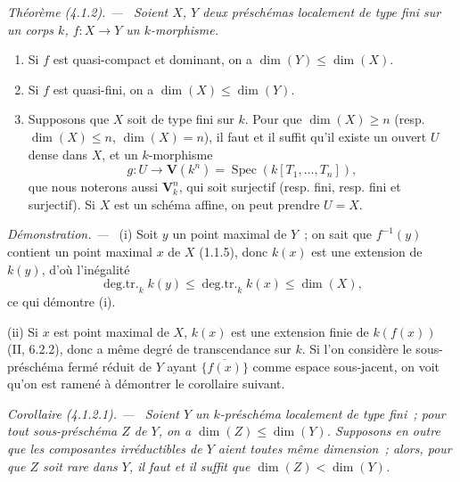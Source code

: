 \documentclass[10pt,oneside]{book}
\newcommand{\oldpage}[2][]{%
  \setcounter{footnote}{0}%
  \marginpar{\scriptsize\textbf{#1}~|~#2}\ignorespaces}
\newenvironment{theorem}[1][]{%
  \par\medskip\noindent\itshape Théorème (#1). ---\ }{\par}
\newenvironment{corollary}[1][]{%
  \par\medskip\noindent\itshape Corollaire (#1). ---\ }{\par}
\newenvironment{proof}{%
  \par\medskip\noindent\textit{Démonstration. ---\ }}{\par}
\begin{document}
\begin{theorem}[4.1.2]
\label{IV.2.4.1.2-fr}
Soient $X$, $Y$ deux préschémas localement de type fini sur un corps $k$,
$f:X\to Y$ un $k$-morphisme.

\oldpage[IV-2]{53}

\begin{enumerate}
\item[(i)] Si $f$ est quasi-compact et dominant, on a
$\dim(Y)\leqslant\dim(X)$.
\item[(ii)] Si $f$ est quasi-fini, on a
$\dim(X)\leqslant\dim(Y)$.
\item[(iii)] Supposons que $X$ soit de type fini sur $k$. Pour que
$\dim(X)\geqslant n$ (resp. $\dim(X)\leqslant n$, $\dim(X)=n$), il faut et il
suffit qu'il existe un ouvert $U$ dense dans $X$, et un $k$-morphisme
\[
g:U\longrightarrow\mathbf V(k^n)
=\operatorname{Spec}(k[T_1,\ldots,T_n]),
\]
que nous noterons aussi $\mathbf V_k^n$, qui soit surjectif (resp. fini,
resp. fini et surjectif). Si $X$ est un schéma affine, on peut prendre $U=X$.
\end{enumerate}
\end{theorem}

\begin{proof}
(i) Soit $y$ un point maximal de $Y$~; on sait que $f^{-1}(y)$ contient un
point maximal $x$ de $X$ (1.1.5), donc $k(x)$ est une extension de $k(y)$,
d'où l'inégalité
\[
\operatorname{deg.tr.}_k k(y)
\leqslant\operatorname{deg.tr.}_k k(x)
\leqslant\dim(X),
\]
ce qui démontre (i).

(ii) Si $x$ est point maximal de $X$, $k(x)$ est une extension finie de
$k(f(x))$ (II, 6.2.2), donc a même degré de transcendance sur $k$. Si l'on
considère le sous-préschéma fermé réduit de $Y$ ayant $\overline{\{f(x)\}}$
comme espace sous-jacent, on voit qu'on est ramené à démontrer le corollaire
suivant.
\end{proof}

\begin{corollary}[4.1.2.1]
\label{IV.2.4.1.2.1-fr}
Soient $Y$ un $k$-préschéma localement de type fini~; pour tout sous-préschéma
$Z$ de $Y$, on a $\dim(Z)\leqslant\dim(Y)$. Supposons en outre que les
composantes irréductibles de $Y$ aient toutes même dimension~; alors, pour que
$Z$ soit rare dans $Y$, il faut et il suffit que
$\dim(Z)<\dim(Y)$.
\end{corollary}
\end{document}
